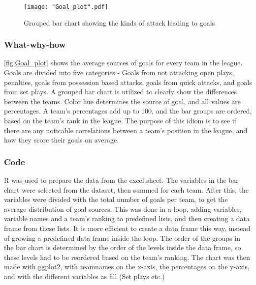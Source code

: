 \documentclass[Report.tex]{subfiles}
\begin{document}
\begin{figure}
\center
\texttt{[image: "Goal\_plot".pdf]}
\caption{Grouped bar chart showing the kinds of attack leading to goals}
\label{Fig:Goal_plot}
\end{figure}

\subsubsection{What-why-how}
\ref{fig:Goal_plot} shows the average sources of goals for every team in the
league. Goals are divided into five categories - Goals from not attacking open
plays, penalties, goals from possession based attacks, goals from quick attacks,
and goals from set plays. 
A grouped bar chart is utilized to clearly show the differences between the
teams. Color hue determines the source of goal, and all values are
percentages. A team's percentages add up to 100, and the bar groups are ordered,
based on the team's rank in the league. 
The purpose of this idiom is to see if there are any noticable correlations
between a team's position in the league, and how they score their goals on
average. 

\subsubsection{Code}
R was used to prepare the data from the excel sheet. The variables in the bar
chart were selected from the dataset, then summed for each team. After this, the
variables were divided with the total number of goals per team, to get the
average distribution of goal sources. 
This was done in a loop, adding variables, variable names and a team's ranking
to predefined lists, and then creating a data frame from these lists. It is more
efficient to create a data frame this way, instead of growing a predefined data
frame inside the loop. 
The order of the groups in the bar chart is determined by the order of the
levels inside the data frame, so these levels had to be reordered based on the
team's ranking.
The chart was then made with ggplot2, with teamnames on the x-axis, the
percentages on the y-axis, and with the different variables as fill (Set plays
etc.)
\end{document}
